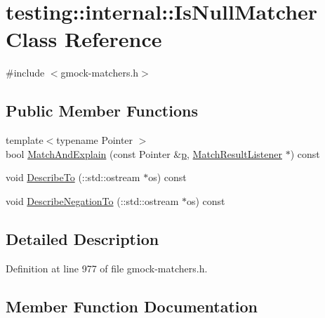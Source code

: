 \hypertarget{classtesting_1_1internal_1_1_is_null_matcher}{}\section{testing\+:\+:internal\+:\+:Is\+Null\+Matcher Class Reference}
\label{classtesting_1_1internal_1_1_is_null_matcher}


{\ttfamily \#include $<$gmock-\/matchers.\+h$>$}

\subsection*{Public Member Functions}
\begin{DoxyCompactItemize}
\item 
{\footnotesize template$<$typename Pointer $>$ }\\bool \hyperlink{classtesting_1_1internal_1_1_is_null_matcher_a9ae0c12b67059f42d1f222fcc9ddc017}{Match\+And\+Explain} (const Pointer \&\hyperlink{jquery_8js_a2335e57f79b6acfb6de59c235dc8a83e}{p}, \hyperlink{classtesting_1_1_match_result_listener}{Match\+Result\+Listener} $\ast$) const 
\item 
void \hyperlink{classtesting_1_1internal_1_1_is_null_matcher_ac7b23381e6aa4736147da929b91b8712}{Describe\+To} (\+::std\+::ostream $\ast$os) const 
\item 
void \hyperlink{classtesting_1_1internal_1_1_is_null_matcher_a3c48cf2ad1be61bd9c8b1f802990417f}{Describe\+Negation\+To} (\+::std\+::ostream $\ast$os) const 
\end{DoxyCompactItemize}


\subsection{Detailed Description}


Definition at line 977 of file gmock-\/matchers.\+h.



\subsection{Member Function Documentation}
